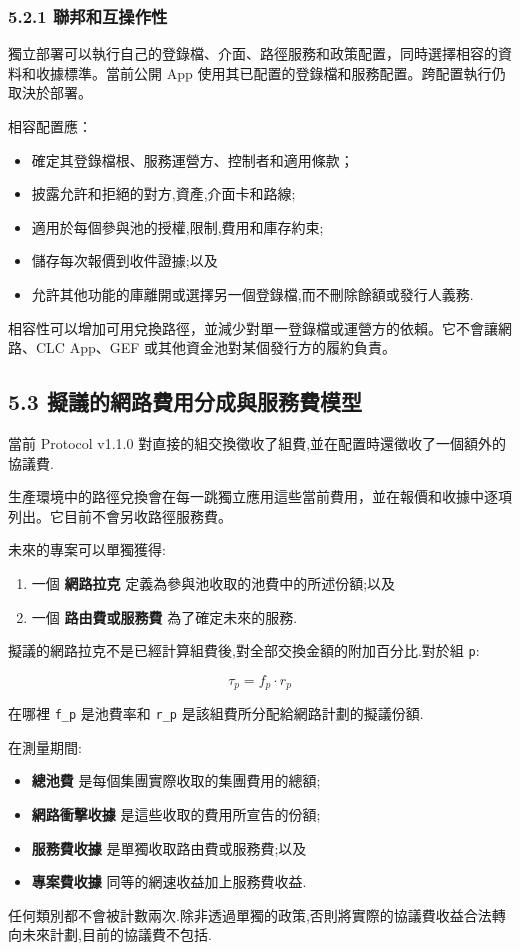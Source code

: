 \documentclass[11pt]{article}
\begin{document}
\subsubsection*{5.2.1 聯邦和互操作性}

獨立部署可以執行自己的登錄檔、介面、路徑服務和政策配置，同時選擇相容的資料和收據標準。當前公開 App 使用其已配置的登錄檔和服務配置。跨配置執行仍取決於部署。

相容配置應：

\begin{itemize}[leftmargin=*]
\item 確定其登錄檔根、服務運營方、控制者和適用條款；
\item 披露允許和拒絕的對方,資產,介面卡和路線;
\item 適用於每個參與池的授權,限制,費用和庫存約束;
\item 儲存每次報價到收件證據;以及
\item 允許其他功能的庫離開或選擇另一個登錄檔,而不刪除餘額或發行人義務.
\end{itemize}
相容性可以增加可用兌換路徑，並減少對單一登錄檔或運營方的依賴。它不會讓網路、CLC App、GEF 或其他資金池對某個發行方的履約負責。

\subsection*{5.3 擬議的網路費用分成與服務費模型}

當前 Protocol v1.1.0 對直接的組交換徵收了組費,並在配置時還徵收了一個額外的協議費.

生產環境中的路徑兌換會在每一跳獨立應用這些當前費用，並在報價和收據中逐項列出。它目前不會另收路徑服務費。

未來的專案可以單獨獲得:

\begin{enumerate}[leftmargin=*]
\item 一個 \textbf{網路拉克} 定義為參與池收取的池費中的所述份額;以及
\item 一個 \textbf{路由費或服務費} 為了確定未來的服務.
\end{enumerate}
擬議的網路拉克不是已經計算組費後,對全部交換金額的附加百分比.對於組 \texttt{p}:

\[
\tau_p = f_p \cdot r_p
\]

在哪裡 \texttt{f\_p} 是池費率和 \texttt{r\_p} 是該組費所分配給網路計劃的擬議份額.

在測量期間:

\begin{itemize}[leftmargin=*]
\item \textbf{總池費} 是每個集團實際收取的集團費用的總額;
\item \textbf{網路衝擊收據} 是這些收取的費用所宣告的份額;
\item \textbf{服務費收據} 是單獨收取路由費或服務費;以及
\item \textbf{專案費收據} 同等的網速收益加上服務費收益.
\end{itemize}
任何類別都不會被計數兩次.除非透過單獨的政策,否則將實際的協議費收益合法轉向未來計劃,目前的協議費不包括.
\end{document}
